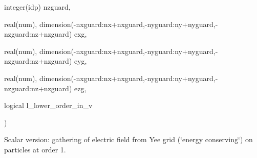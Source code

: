 {\begin{DoxyParamCaption}
\item[{integer(idp)}]{nzguard, }
\item[{real(num), dimension(-\/nxguard\+:nx+nxguard,-\/nyguard\+:ny+nyguard,-\/nzguard\+:nz+nzguard)}]{exg, }
\item[{real(num), dimension(-\/nxguard\+:nx+nxguard,-\/nyguard\+:ny+nyguard,-\/nzguard\+:nz+nzguard)}]{eyg, }
\item[{real(num), dimension(-\/nxguard\+:nx+nxguard,-\/nyguard\+:ny+nyguard,-\/nzguard\+:nz+nzguard)}]{ezg, }
\item[{logical}]{l\+\_\+lower\+\_\+order\+\_\+in\+\_\+v}
\end{DoxyParamCaption}
)}\hypertarget{field__gathering_8_f90_a13e24ff5639b3dcf1e9cd8e51a1caf53}{}\label{field__gathering_8_f90_a13e24ff5639b3dcf1e9cd8e51a1caf53}


Scalar version\+: gathering of electric field from Yee grid (\char`\"{}energy conserving\char`\"{}) on particles at order 1. 

